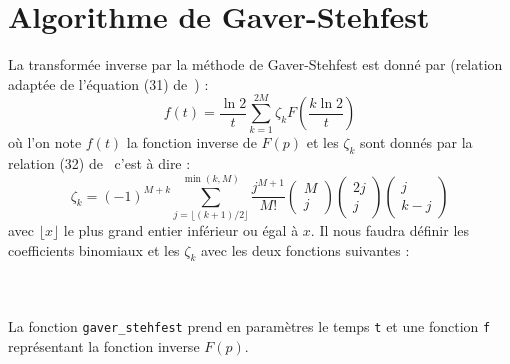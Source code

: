 \section{Algorithme de Gaver-Stehfest}
La transformée inverse par la méthode de Gaver-Stehfest est donné par 
(relation adaptée de l'équation (31) de~\cite{abate2006}) :
\[
f(t)=\dfrac{\ln{2}}{t}\sum_{k=1}^{2M}\zeta_kF\left(\dfrac{k\ln{2}}{t}\right)
\]
où l'on note $f(t)$ la fonction inverse de $F(p)$ et les $\zeta_k$ sont
donnés par la relation (32) de~\cite{abate2006} c'est à dire :
\[
\zeta_k = (-1)^{M+k} \sum_{j=\lfloor(k+1)/2\rfloor}^{\min{(k,M)}} 
\dfrac{j^{M+1}}{M!}\begin{pmatrix} M\\j  \end{pmatrix}
                   \begin{pmatrix} 2j\\j \end{pmatrix}
                   \begin{pmatrix} j\\k-j\end{pmatrix}
\]
avec $\lfloor x \rfloor$ le plus grand entier inférieur ou égal à $x$. Il 
nous faudra définir les coefficients binomiaux et les $\zeta_k$ avec les
deux fonctions suivantes :
\clearpage
\inputminted{python}{codes/python/coeff_bin-annexe_invL.py}
\inputminted{python}{codes/python/zeta-annexe_invL.py}
\clearpage
\inputminted{python}{codes/python/gaver_stehfest-annexe_invL.py}
La fonction \texttt{gaver\_stehfest} prend en paramètres 
le temps \texttt{t} et une fonction \texttt{f} représentant la fonction inverse 
$F(p)$.
